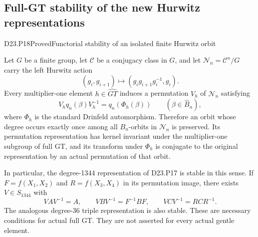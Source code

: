 \subsection{Full-GT stability of the new Hurwitz representations}

\begin{statement}{D23.P18}{Proved}{Functorial stability of an isolated finite Hurwitz orbit}
\end{statement}
Let $G$ be a finite group, let $\mathcal C$ be a conjugacy class
in $G$, and let $\mathcal N_n=\mathcal C^n/G$ carry the left
Hurwitz action
\[
 (g_i,g_{i+1})\longmapsto(g_i g_{i+1}g_i^{-1},g_i).
\]
Every multiplier-one element $h\in\widehat{GT}$ induces a
permutation $V_h$ of $\mathcal N_n$ satisfying
\[
 V_h q_n(\beta)V_h^{-1}=q_n(\Phi_h(\beta))
 \qquad(\beta\in\widehat B_n),
 \tag{D23.P18.1}
\]
where $\Phi_h$ is the standard Drinfeld automorphism. Therefore
an orbit whose degree occurs exactly once among all
$B_n$-orbits in $\mathcal N_n$ is preserved. Its permutation
representation has kernel invariant under the multiplier-one
subgroup of full GT, and its transform
under $\Phi_h$ is conjugate to the original representation by
an actual permutation of that orbit.

In particular, the degree-1344 representation of D23.P17 is
stable in this sense. If $F=f(X_1,X_2)$ and $R=f(X_3,X_4)$ in
its permutation image, there exists $V\in S_{1344}$ with
\[
 \boxed{\quad
 VAV^{-1}=A,\qquad
 VBV^{-1}=F^{-1}BF,\qquad
 VCV^{-1}=RCR^{-1}.
 \quad}                                                     \tag{D23.P18.2}
\]
The analogous degree-36 triple representation is also stable.
These are necessary conditions for actual full GT. They are
not asserted for every actual gentle element.

